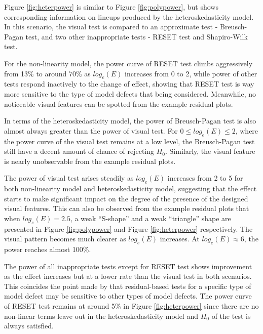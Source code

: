 \documentclass[]{interact}
\theoremstyle{plain}%
\theoremstyle{definition}
\theoremstyle{remark}
\begin{document}
Figure \ref{fig:heterpower} is similar to Figure \ref{fig:polypower},
but shows corresponding information on lineups produced by the
heteroskedasticity model. In this scenario, the visual test is compared
to an approximate test - Breusch-Pagan test, and two other inappropriate
tests - RESET test and Shapiro-Wilk test.

For the non-linearity model, the power curve of RESET test climbs
aggressively from 13\% to around 70\% as \(log_e(E)\) increases from 0
to 2, while power of other tests respond inactively to the change of
effect, showing that RESET test is way more sensitive to the type of
model defects that being considered. Meanwhile, no noticeable visual
features can be spotted from the example residual plots.

In terms of the heteroskedasticity model, the power of Breusch-Pagan
test is also almost always greater than the power of visual test. For
\(0 \leq log_e(E) \leq 2\), where the power curve of the visual test
remains at a low level, the Breusch-Pagan test still have a decent
amount of chance of rejecting \(H_0\). Similarly, the visual feature is
nearly unobservable from the example residual plots.

The power of visual test arises steadily as \(log_e(E)\) increases from
2 to 5 for both non-linearity model and heteroskedasticity model,
suggesting that the effect starts to make significant impact on the
degree of the presence of the designed visual features. This can also be
observed from the example residual plots that when \(log_e(E) = 2.5\), a
weak ``S-shape'' and a weak ``triangle'' shape are presented in Figure
\ref{fig:polypower} and Figure \ref{fig:heterpower} respectively. The
visual pattern becomes much clearer as \(log_e(E)\) increases. At
\(log_e(E) \approx 6\), the power reaches almost 100\%.

The power of all inappropriate tests except for RESET test shows
improvement as the effect increases but at a lower rate than the visual
test in both scenarios. This coincides the point made by
\citet{cook1982residuals} that residual-based tests for a specific type
of model defect may be sensitive to other types of model defects. The
power curve of RESET test remains at around 5\% in Figure
\ref{fig:heterpower} since there are no non-linear terms leave out in
the heteroskedasticity model and \(H_0\) of the test is always
satisfied.
\end{document}
